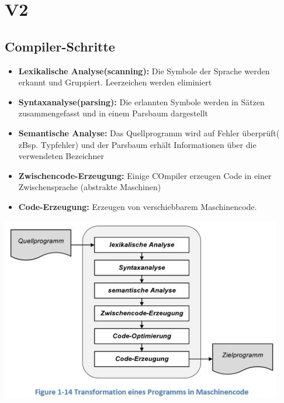 \section{V2}
\subsection{Compiler-Schritte}
\vspace{-0.5cm}
\begin{multicols}{2}
    \begin{minipage}{\linewidth}
    \begin{itemize}
        \item \textbf{Lexikalische Analyse(scanning):}\newline
        Die Symbole der Sprache werden erkannt und Gruppiert. Leerzeichen werden eliminiert
        \item \textbf{Syntaxanalyse(parsing):} Die erlannten Symbole werden in Sätzen zusammengefasst und in einem Parsbaum dargestellt
        \item \textbf{Semantische Analyse:} Das Quellprogramm wird auf Fehler überprüft( zBsp. Typfehler) und der Parsbaum erhält Informationen über die verwendeten Bezeichner
        \item \textbf{Zwischencode-Erzeugung:} Einige COmpiler erzeugen Code in einer Zwischensprache (abstrakte Maschinen)
        \item \textbf{Code-Erzeugung:} Erzeugen von verschiebbarem Maschinencode.      
    \end{itemize}
\end{minipage}

    \includegraphics[width=\linewidth]{images/CompilerWorkflow2}
\end{multicols}

